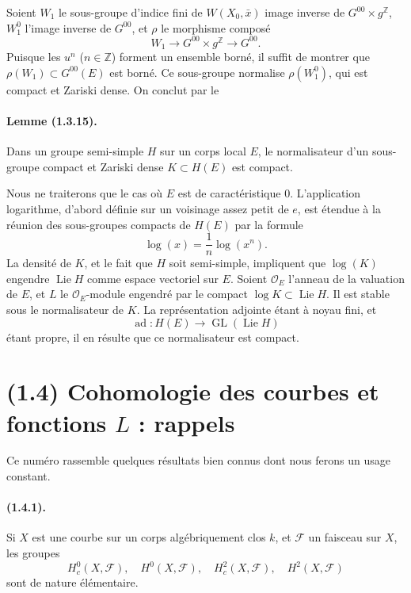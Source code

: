 \documentclass[11pt]{article}
\theoremstyle{remark}
\newcommand{\ZZ}{\mathbb{Z}}
\newcommand{\GL}{\operatorname{GL}}
\newcommand{\Lie}{\operatorname{Lie}}
\newcommand{\ad}{\operatorname{ad}}
\begin{document}
Soient $W_1$ le sous-groupe d'indice fini de $W(X_0,\bar x)$ image inverse de $G^{00}\times g^\ZZ$, $W_1^0$ l'image inverse de $G^{00}$, et $\rho$ le morphisme composé
\[
W_1\longrightarrow G^{00}\times g^\ZZ\longrightarrow G^{00}.
\]
Puisque les $u^n$ ($n\in\ZZ$) forment un ensemble borné, il suffit de montrer que $\rho(W_1)\subset G^{00}(E)$ est borné. Ce sous-groupe normalise $\rho(W_1^0)$, qui est compact et Zariski dense. On conclut par le

\paragraph{Lemme (1.3.15).} Dans un groupe semi-simple $H$ sur un corps local $E$, le normalisateur d'un sous-groupe compact et Zariski dense $K\subset H(E)$ est compact.

Nous ne traiterons que le cas où $E$ est de caractéristique $0$. L'application logarithme, d'abord définie sur un voisinage assez petit de $e$, est étendue à la réunion des sous-groupes compacts de $H(E)$ par la formule
\[
\log(x)=\frac1n\log(x^n).
\]
La densité de $K$, et le fait que $H$ soit semi-simple, impliquent que $\log(K)$ engendre $\Lie H$ comme espace vectoriel sur $E$. Soient $\mathcal O_E$ l'anneau de la valuation de $E$, et $L$ le $\mathcal O_E$-module engendré par le compact $\log K\subset\Lie H$. Il est stable sous le normalisateur de $K$. La représentation adjointe étant à noyau fini, et
\[
\ad:H(E)\longrightarrow\GL(\Lie H)
\]
étant propre, il en résulte que ce normalisateur est compact.




\section*{(1.4) Cohomologie des courbes et fonctions \texorpdfstring{$L$}{L} : rappels}

Ce numéro rassemble quelques résultats bien connus dont nous ferons un usage constant.

\paragraph{(1.4.1).} Si $X$ est une courbe sur un corps algébriquement clos $k$, et $\mathcal F$ un faisceau sur $X$, les groupes
\[
H^0_c(X,\mathcal F),\quad H^0(X,\mathcal F),\quad H^2_c(X,\mathcal F),\quad H^2(X,\mathcal F)
\]
sont de nature élémentaire.
\end{document}
